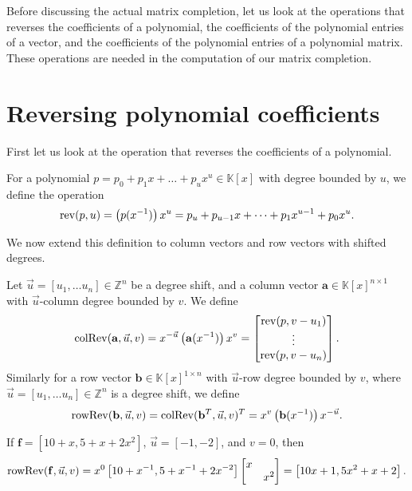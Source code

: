 Before discussing the actual matrix completion, let us look at the
operations that reverses the coefficients of a polynomial, the coefficients
of the polynomial entries of a vector, and the coefficients of the
polynomial entries of a polynomial matrix. These operations are needed
in the computation of our matrix completion.


\section{Reversing polynomial coefficients}

First let us look at the operation that reverses the coefficients
of a polynomial.
\begin{defn}
For a polynomial $p=p_{0}+p_{1}x+\dots+p_{u}x^{u}\in\mathbb{K}\left[x\right]$
with degree bounded by $u$, we define the operation 
\[
\operatorname{rev}(p,u)=\left(p(x^{-1})\right)x^{u}=p_{u}+p_{u-1}x+\cdots+p_{1}x^{u-1}+p_{0}x^{u}.
\]

\end{defn}
We now extend this definition to column vectors and row vectors with
shifted degrees.
\begin{defn}
Let $\vec{u}=\left[u_{1},\dots u_{n}\right]\in\mathbb{Z}^{n}$ be
a degree shift, and a column vector $\mathbf{a}\in\mathbb{K}\left[x\right]^{n\times1}$
with $\vec{u}$-column degree bounded by $v$. We define
\[
\operatorname{colRev}(\mathbf{a},\vec{u},v)=x^{-\vec{u}}\left(\mathbf{a}(x^{-1})\right)x^{v}=\begin{bmatrix}\operatorname{rev}(p,v-u_{1})\\
\vdots\\
\operatorname{rev}(p,v-u_{n})
\end{bmatrix}.
\]
Similarly for a row vector $\mathbf{b}\in\mathbb{K}\left[x\right]^{1\times n}$
with $\vec{u}$-row degree bounded by $v$, where $\vec{u}=\left[u_{1},\dots u_{n}\right]\in\mathbb{Z}^{n}$
is a degree shift, we define
\[
\operatorname{rowRev}(\mathbf{b},\vec{u},v)=\operatorname{colRev}(\mathbf{b}^{T},\vec{u},v)^{T}=x^{v}\left(\mathbf{b}(x^{-1})\right)x^{-\vec{u}}.
\]
\end{defn}
\begin{example}
If $\mathbf{f}=\left[10+x,5+x+2x^{2}\right]$, $\vec{u}=\left[-1,-2\right]$,
and $v=0$, then 
\[
\operatorname{rowRev}(\mathbf{f},\vec{u},v)=x^{0}\left[10+x^{-1},5+x^{-1}+2x^{-2}\right]\begin{bmatrix}x\\
 & x^{2}
\end{bmatrix}=\left[10x+1,5x^{2}+x+2\right].
\]

\end{example}
